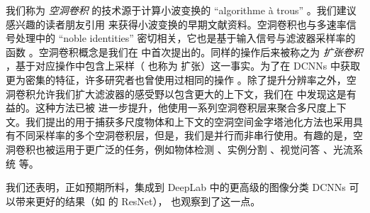 我们称为 \textit{空洞卷积} 的技术源于计算小波变换的 ``algorithme \`a trous'' \cite{holschneider1989real}。我们建议感兴趣的读者朋友引用 \cite{fowler2005redundant} 来获得小波变换的早期文献资料。空洞卷积也与多速率信号处理中的 ``noble identities'' 密切相关，它也是基于输入信号与滤波器采样率的函数 \cite{vaidyanathan1990multirate}。空洞卷积概念是我们在 \cite{papandreou2014untangling} 中首次提出的。同样的操作后来被称之为 \textit{扩张卷积} \cite{yu2015multi}，基于对应操作中包含上采样（\cite{holschneider1989real} 也称为 扩张）这一事实。为了在 DCNNs 中获取更为密集的特征，许多研究者也曾使用过相同的操作 \cite{giusti2013fast, sermanet2013overfeat, papandreou2014untangling}。除了提升分辨率之外，空洞卷积允许我们扩大滤波器的感受野以包含更大的上下文，我们在 \cite{chen2014semantic} 中发现这是有益的。这种方法已被 \cite{yu2015multi} 进一步提升，他使用一系列空洞卷积层来聚合多尺度上下文。我们提出的用于捕获多尺度物体和上下文的空洞空间金字塔池化方法也采用具有不同采样率的多个空洞卷积层，但是，我们是并行而非串行使用。有趣的是，空洞卷积也被运用于更广泛的任务，例如物体检测 \cite{liu2015ssd,dai2016rfcn}、实例分割 \cite{dai2016instance}、视觉问答 \cite{chen2015abc}、光流系统 \cite{sevilla2016optical} 等。

我们还表明，正如预期所料，集成到 DeepLab 中的更高级的图像分类 DCNNs 可以带来更好的结果（如 \cite{he2015deep} 的 ResNet）， \cite{wu2016high} 也观察到了这一点。
